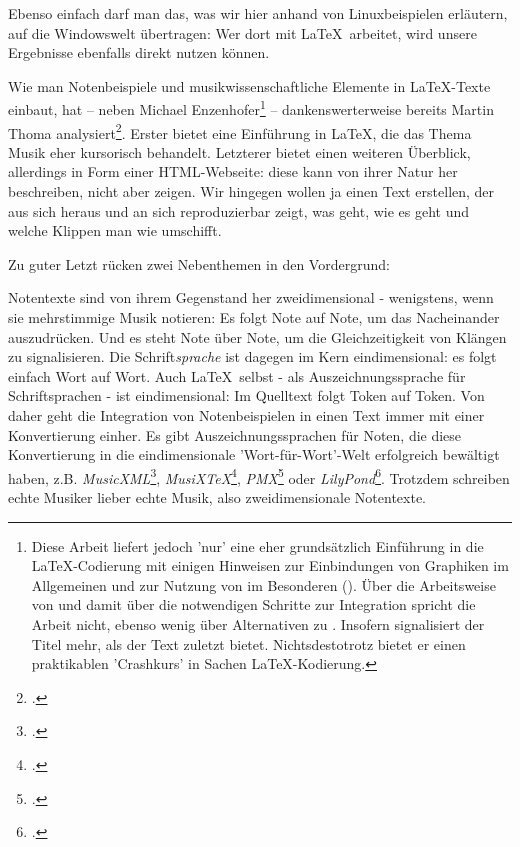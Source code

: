 Ebenso einfach darf man das, was wir hier anhand von Linuxbeispielen erläutern,
auf die Windowswelt übertragen: Wer dort mit \LaTeX\ arbeitet, wird unsere
Ergebnisse ebenfalls direkt nutzen können.

Wie man Notenbeispiele und musikwissenschaftliche Elemente in \LaTeX-Texte
einbaut, hat -- neben Michael Enzenhofer\footnote{Diese Arbeit liefert jedoch
'nur' eine eher grundsätzlich Einführung in die \LaTeX-Co\-die\-rung mit einigen
Hinweisen zur Einbindungen von Graphiken im Allgemeinen und zur Nutzung von
 im Besonderen (\cite[vgl. dazu][4ff, 31ff u.
21ff]{Enzenhofer2016a}). Über die Arbeitsweise von  und damit über
die notwendigen Schritte zur Integration spricht die Arbeit nicht, ebenso wenig
über Alternativen zu . Insofern signalisiert der Titel mehr, als
der Text zuletzt bietet. Nichtsdestotrotz bietet er einen praktikablen
'Crashkurs' in Sachen \LaTeX-Kodierung.} -- dankenswerterweise bereits Martin
Thoma analysiert\footcite[vgl.][\nopage wp]{Thoma2018a}. Erster bietet eine
Einführung in \LaTeX, die das Thema Musik eher kursorisch behandelt. Letzterer
bietet einen weiteren Überblick, allerdings in Form einer HTML-Webseite:
diese kann von ihrer Natur her beschreiben, nicht aber zeigen. Wir hingegen
wollen ja einen Text erstellen, der aus sich heraus und an sich reproduzierbar
zeigt, was geht, wie es geht und welche Klippen man wie umschifft.

Zu guter Letzt rücken zwei Nebenthemen in den Vordergrund:

Notentexte sind von ihrem Gegenstand her zweidimensional - wenigstens, wenn sie
mehrstimmige Musik notieren: Es folgt Note auf Note, um das Nacheinander
auszudrücken. Und es steht Note über Note, um die Gleichzeitigkeit von Klängen
zu signalisieren. Die Schrift\textit{sprache} ist dagegen im Kern eindimensional:
es folgt einfach Wort auf Wort. Auch \LaTeX\ selbst - als Auszeichnungssprache
für Schriftsprachen - ist eindimensional: Im Quelltext folgt Token auf Token.
Von daher geht die Integration von Notenbeispielen in einen Text immer mit einer
Konvertierung einher. Es gibt Auszeichnungssprachen für Noten, die diese
Konvertierung in die eindimensionale 'Wort-für-Wort'-Welt erfolgreich bewältigt
haben, z.B. \textit{MusicXML}\footcite[vgl.][\nopage wp]{MusicXML2018a},
\textit{MusiX\TeX}\footcite[vgl.][\nopage wp]{CtanMusixTex2018a},
\textit{PMX}\footcite[vgl.][\nopage wp]{CtanPmx2018a} oder
\textit{LilyPond}\footcite[vgl.][\nopage wp]{LilyPond2018a}. Trotzdem schreiben
echte Musiker lieber echte Musik, also zweidimensionale Notentexte.

